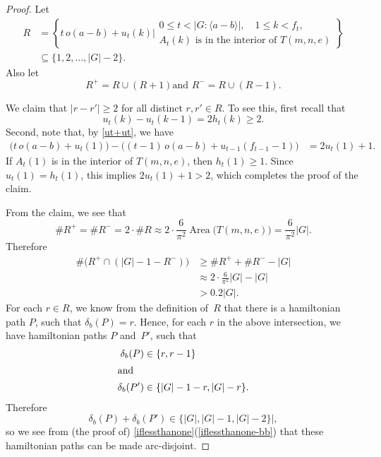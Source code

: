 \documentclass[11pt]{amsart}
\newcommand{\fullcref}[2]{\cref{#1}(\ref{#1-#2})}
\theoremstyle{definition}
\numberwithin{case}{startcases}
\numberwithin{equation}{section}
\DeclareMathOperator{\Area}{Area}
\begin{document}
	\begin{proof}
		Let
		\begin{align*}
			R 
			&= \left\{ t \, o(a - b) + u_t(k) 
			\mathrel{\Big|}
			\begin{matrix}
				0 \le t < |G : \langle a - b \rangle|,
				\quad
				1 \le k < f_t, \\
				\text{$A_t(k)$ is in the interior of $T(m,n,e)$}
			\end{matrix} \right\}
			\\&\subseteq \{1,2, \ldots, |G| - 2 \}
			. \end{align*}
		Also let
		\[ \text{$R^+ = R \cup (R + 1)$
			and
			$R^- = R \cup (R - 1)$} . \]
		
		We claim that $|r - r'| \ge 2$ for all distinct $r,r' \in R$. To see this, first recall that 
		\[ u_t(k) - u_t(k - 1) = 2 h_t(k) \ge 2 . \]
		Second, note that, by \cref{ut+ut}, we have
		\begin{align*}
			\bigl( t \, o(a - b) + u_t(1) \bigr) - \bigl( (t-1) \, o(a - b)  + u_{t-1}(f_{t-1} - 1) \bigr)
			&= 2u_t(1) + 1
			. \end{align*} 
		If $A_t(1)$ is in the interior of $T(m,n,e)$, then $h_t(1) \ge 1$. Since $u_t(1) = h_t(1)$, this implies $2u_t(1) + 1 > 2$, which completes the proof of the claim.
		
		From the claim, we see that
		\[\# R^+ 
		= \# R^- 
		= 2 \cdot \#R 
		\approx 2 \cdot \frac{6}{\pi^2} \Area \bigl( T(m,n,e) \bigr)
		= \frac{6}{\pi^2} |G|
		. \]
		Therefore
		\begin{align*}
			\# \bigl( R^+ \cap (|G| - 1 - R^-) \bigr)
			&\ge \# R^+ + \# R^- - |G|
			\\&\approx 2 \cdot \frac{6}{\pi^2} |G| - |G|
			\\&> 0.2 |G|
			. \end{align*}
		For each $r \in R$, we know from the definition of~$R$ that there is a hamiltonian path $P$, such that $\delta_b(P) = r$. Hence, for each $r$ in the above intersection, we have hamiltonian paths $P$ and~$P'$, such that 
		\begin{align*}
			\delta_b(P) &\in \{r, r-1\} \\
			\intertext{and}
			\delta_b(P') &\in 
			\{|G| - 1 - r, |G| - r \}
			. \end{align*}
		Therefore 
		\[ \delta_b(P) + \delta_b(P')
		\in \{|G|, |G| - 1, |G| - 2\}| , \]
		so we see from (the proof of) \fullcref{iflessthanone}{bb} that these hamiltonian paths can be made arc-disjoint.
		

\end{proof}
\end{document}
